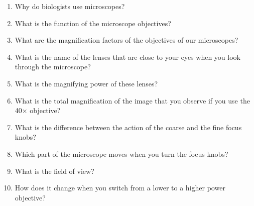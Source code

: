 \begin{enumerate}
\def\labelenumi{\arabic{enumi}.}
\tightlist
\item
  Why do biologists use microscopes?
\item
  What is the function of the microscope objectives?
\item
  What are the magnification factors of the objectives of our microscopes?
\item
  What is the name of the lenses that are close to your eyes when you look through the microscope?
\item
  What is the magnifying power of these lenses?
\item
  What is the total magnification of the image that you observe if you use the 40× objective?
\item
  What is the difference between the action of the coarse and the fine focus knobs?
\item
  Which part of the microscope moves when you turn the focus knobs?
\item
  What is the field of view?
\item
  How does it change when you switch from a lower to a higher power objective?
\end{enumerate}


